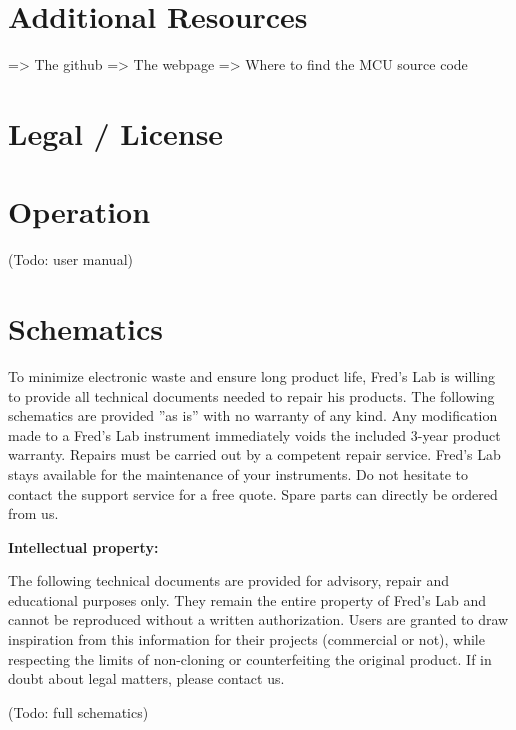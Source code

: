 \documentclass{scrartcl}
\begin{document}
\pagebreak


\section{Additional Resources}

=> The github
=> The webpage
=> Where to find the MCU source code

\pagebreak


\section{Legal / License}

\pagebreak


\section{Operation}

 (Todo: user manual)


\section{Schematics}

To minimize electronic waste and ensure long product life, Fred’s Lab is willing to provide all technical documents needed to repair his products. The following schematics are provided ”as is” with no warranty of any kind. Any modification made to a Fred’s Lab instrument immediately voids the included 3-year product warranty. Repairs must be carried out by a competent repair service. Fred’s Lab stays available for the maintenance of your instruments. Do not hesitate to contact the support service for a free quote. Spare parts can directly be ordered from us.

\textbf{Intellectual property:}

The following technical documents are provided for advisory, repair and educational purposes only. They remain the entire property of Fred's Lab and cannot be reproduced without a written authorization. Users are granted to draw inspiration from this information for their projects (commercial or not), while respecting the limits of non-cloning or counterfeiting the original product. If in doubt about legal matters, please contact us.

\begin{center}
    (Todo: full schematics)
\end{center}
\end{document}
